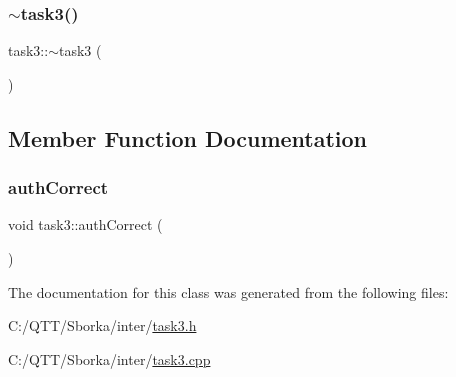 \mbox{\label{classtask3_ad2e55a3c68b7378fd4d917c7a700de58}} 
\subsubsection{\texorpdfstring{$\sim$task3()}{~task3()}}
{\footnotesize\ttfamily task3\+::$\sim$task3 (\begin{DoxyParamCaption}{ }\end{DoxyParamCaption})}



\subsection{Member Function Documentation}
\mbox{\label{classtask3_aa3b4c71fbe1fe7cd10bbf4d423073307}} 
\subsubsection{\texorpdfstring{auth\+Correct}{authCorrect}}
{\footnotesize\ttfamily void task3\+::auth\+Correct (\begin{DoxyParamCaption}{ }\end{DoxyParamCaption})\hspace{0.3cm}{\ttfamily [signal]}}



The documentation for this class was generated from the following files\+:\begin{DoxyCompactItemize}
\item 
C\+:/\+Q\+T\+T/\+Sborka/inter/\mbox{\hyperlink{task3_8h}{task3.\+h}}\item 
C\+:/\+Q\+T\+T/\+Sborka/inter/\mbox{\hyperlink{task3_8cpp}{task3.\+cpp}}\end{DoxyCompactItemize}
